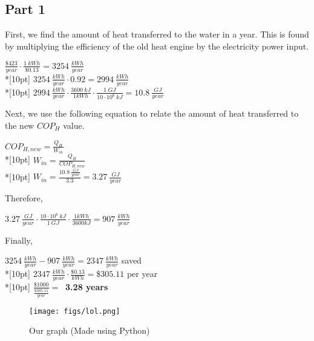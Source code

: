 \documentclass{article}
\begin{document}
\subsection{Part 1}
First, we find the amount of heat transferred to the water in a year. This is found by multiplying the efficiency of the old heat engine by the electricity power input.
\begin{center}
    \(\displaystyle \frac{\$423}{year}\cdot \frac{1 \: kWh}{\$0.13} = 3254\:\frac{kWh}{year}\)\\*[10pt]
    \(\displaystyle 3254\:\frac{kWh}{year} \cdot 0.92 = 2994\:\frac{kWh}{year}\)\\*[10pt]
    \(\displaystyle 2994\:\frac{kWh}{year}\cdot \frac{3600\:kJ}{1 kWh}\cdot \frac{1\:GJ}{10\cdot 10^6 \: kJ} = 10.8 \:\frac{GJ}{year}\)
\end{center}
Next, we use the following equation to relate the amount of heat transferred to the new \(COP_H\) value.
\begin{center}
    \(\displaystyle COP_{H, new} = \frac{Q_H}{W_{in}}\)\\*[10pt]
    \(\displaystyle W_{in} = \frac{Q_H}{COP_{H, new}}\)\\*[10pt]
    \(\displaystyle W_{in} = \frac{10.8\:\frac{GJ}{year}}{3.3} = 3.27\:\frac{GJ}{year}\)
\end{center}
\clearpage \noindent
Therefore,
\begin{center}
    \(\displaystyle 3.27\:\frac{GJ}{year}\cdot \frac{10\cdot 10^6 \: kJ}{1\:GJ} \cdot \frac{1 kWh}{3600 kJ} = 907 \:\frac{kWh}{year}\)
\end{center}
Finally,
\begin{center}
    \(\displaystyle 3254 \:\frac{kWh}{year} - 907 \:\frac{kWh}{year} = 2347 \:\frac{kWh}{year}\) saved \\*[10pt]
    \(\displaystyle 2347\:\frac{kWh}{year}\cdot \frac{\$0.13}{kWh} = \$305.11\) per year \\*[10pt]
    \(\displaystyle \frac{\$1000}{\frac{\$305.11}{year}} =\:\) \textbf{3.28 years}
\end{center}
\clearpage \noindent
\begin{figure}
    \centering
    \texttt{[image: figs/lol.png]}
    \caption{Our graph (Made using Python)}
    \label{fig:enter-label}
\end{figure}
\end{document}
